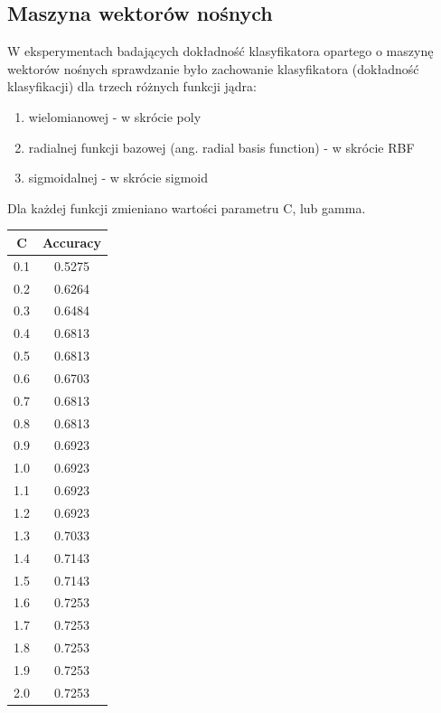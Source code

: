 \documentclass{classrep}
\begin{document}
{        \subsection{Maszyna wektorów nośnych}
        \label{svm_results} {
        W eksperymentach badających dokładność klasyfikatora opartego o maszynę wektorów nośnych sprawdzanie było zachowanie klasyfikatora (dokładność klasyfikacji) dla trzech różnych funkcji jądra:
        \begin{enumerate}
            \item wielomianowej - w skrócie poly
            \item radialnej funkcji bazowej (ang. radial basis function) - w skrócie RBF
            \item sigmoidalnej - w skrócie sigmoid
        \end{enumerate}
        Dla każdej funkcji zmieniano wartości parametru C, lub gamma.
        \begin{table}[!htbp]
    \begin{minipage}{.35\textwidth}
        \centering
        \begin{tabular}{|c|c|}
            \hline
			C & Accuracy \\ \hline
			0.1 & 0.5275 \\ \hline
			0.2 & 0.6264 \\ \hline
			0.3 & 0.6484 \\ \hline
			0.4 & 0.6813 \\ \hline
			0.5 & 0.6813 \\ \hline
			0.6 & 0.6703 \\ \hline
			0.7 & 0.6813 \\ \hline
			0.8 & 0.6813 \\ \hline
			0.9 & 0.6923 \\ \hline
			1.0 & 0.6923 \\ \hline
			1.1 & 0.6923 \\ \hline
			1.2 & 0.6923 \\ \hline
			1.3 & 0.7033 \\ \hline
			1.4 & 0.7143 \\ \hline
			1.5 & 0.7143 \\ \hline
			1.6 & 0.7253 \\ \hline
			1.7 & 0.7253 \\ \hline
			1.8 & 0.7253 \\ \hline
			1.9 & 0.7253 \\ \hline
			2.0 & 0.7253 \\ \hline

\end{tabular}
\end{minipage}
\end{table}}}
\end{document}
